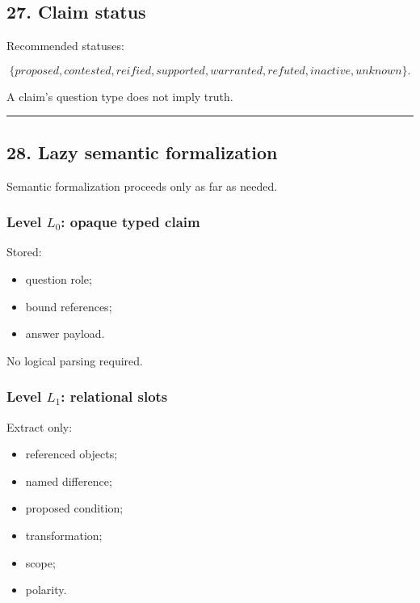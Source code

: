 \documentclass[
]{article}
\providecommand{\tightlist}{%
  \setlength{\itemsep}{0pt}\setlength{\parskip}{0pt}}
\begin{document}
\subsection{27. Claim status}\label{claim-status}

Recommended statuses:

\[
\boxed{
\{
proposed,
contested,
reified,
supported,
warranted,
refuted,
inactive,
unknown
\}.
}
\]

A claim's question type does not imply truth.

\begin{center}\rule{0.5\linewidth}{0.5pt}\end{center}

\subsection{28. Lazy semantic
formalization}\label{lazy-semantic-formalization}

Semantic formalization proceeds only as far as needed.

\subsubsection{\texorpdfstring{Level \(L_0\): opaque typed
claim}{Level L\_0: opaque typed claim}}\label{level-l_0-opaque-typed-claim}

Stored:

\begin{itemize}
\tightlist
\item
  question role;
\item
  bound references;
\item
  answer payload.
\end{itemize}

No logical parsing required.

\subsubsection{\texorpdfstring{Level \(L_1\): relational
slots}{Level L\_1: relational slots}}\label{level-l_1-relational-slots}

Extract only:

\begin{itemize}
\tightlist
\item
  referenced objects;
\item
  named difference;
\item
  proposed condition;
\item
  transformation;
\item
  scope;
\item
  polarity.
\end{itemize}
\end{document}
